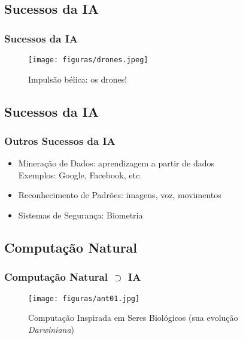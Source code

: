 \documentclass{beamer}
\begin{document}
\subsection{Sucessos da IA}
\begin{frame}
\frametitle{Sucessos da IA}

\begin{figure}[ht!]
 \centering
 \texttt{[image: figuras/drones.jpeg]}
\caption{Impulsão bélica: os drones!}

\end{figure}

\end{frame}



\subsection{Sucessos da IA}
\begin{frame}
\frametitle{Outros Sucessos da IA}
\begin{block}{}
  \begin{itemize}
   \item Mineração de Dados: aprendizagem a partir de dados\\
   Exemplos: Google, Facebook, etc.

    \item Reconhecimento de Padrões: imagens, voz, movimentos

    \item Sistemas de Segurança: Biometria 


    
    \end{itemize}
  
\end{block}

\end{frame}


\subsection{Computação Natural}

\begin{frame}
\frametitle{Computação Natural $\supset $ IA}

\begin{figure}[ht!]
 \centering
 \texttt{[image: figuras/ant01.jpg]}

\caption{Computação Inspirada em Seres Biológicos (sua evolução \textit{Darwiniana})} 
\end{figure}

\end{frame}
\end{document}
